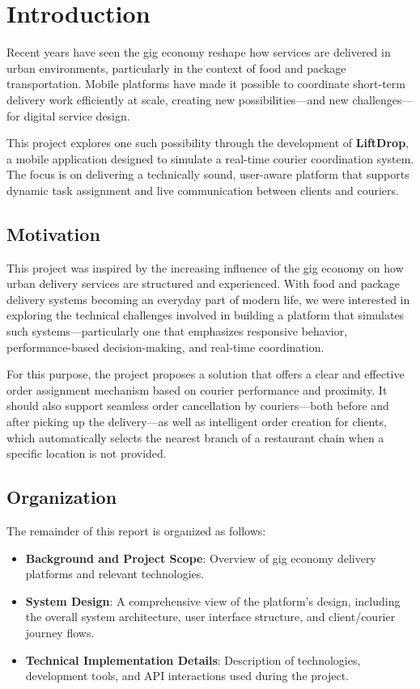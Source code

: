 \section{Introduction}

Recent years have seen the gig economy reshape how services are delivered in urban environments, particularly in the context of food and package transportation. Mobile platforms have made it possible to coordinate short-term delivery work efficiently at scale, creating new possibilities—and new challenges—for digital service design.

This project explores one such possibility through the development of \textbf{LiftDrop}, a mobile application designed to simulate a real-time courier coordination system. The focus is on delivering a technically sound, user-aware platform that supports dynamic task assignment and live communication between clients and couriers.



\vspace{3mm}

\subsection{Motivation}

This project was inspired by the increasing influence of the gig economy on how urban delivery services are structured and experienced. With food and package delivery systems becoming an everyday part of modern life, we were interested in exploring the technical challenges involved in building a platform that simulates such systems—particularly one that emphasizes responsive behavior, performance-based decision-making, and real-time coordination.

\vspace{3mm}

For this purpose, the project proposes a solution that offers a clear and effective order assignment mechanism based on courier performance and proximity. It should also support seamless order cancellation by couriers—both before and after picking up the delivery—as well as intelligent order creation for clients, which automatically selects the nearest branch of a restaurant chain when a specific location is not provided.

\subsection{Organization}

The remainder of this report is organized as follows:
\begin{itemize}
    \item \textbf{Background and Project Scope}: Overview of gig economy delivery platforms and relevant technologies.
    \item \textbf{System Design}: A comprehensive view of the platform’s design, including the overall system architecture, user interface structure, and client/courier journey flows.
    \item \textbf{Technical Implementation Details}: Description of technologies, development tools, and API interactions used during the project.
\end{itemize}
